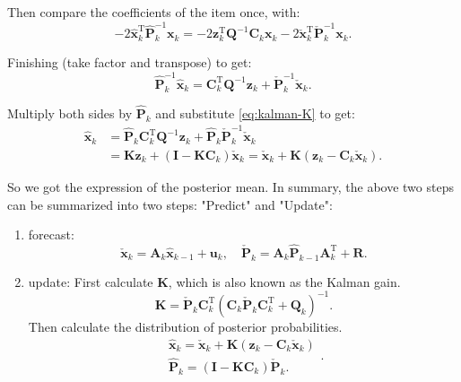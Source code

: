 Then compare the coefficients of the item once, with:
\begin{equation}
- 2\hat {\bm{x}}_k^\mathrm{T} \hat{\bm{P}}_k^{ - 1}{\bm{x}_k} =  - 2\bm{z}_k^\mathrm{T} {\bm{Q}^{ - 1}}{\bm{C}_k}{\bm{x}_k} - 2\bm{\check {x}}_k^\mathrm{T} \bm{\check {P}}_k^{ - 1}{\bm{x}_k}.
\end{equation}

Finishing (take factor and transpose) to get:
\begin{equation}
\hat { \bm{P}}_k^{ - 1}{{\hat{\bm{x}}}_k} = \bm{C}_k^\mathrm{T} {\bm{Q}^{ - 1}}{\bm{z}_k} + \check{\bm{P}}_k^{ - 1}{{\bm{\check{x}}}_k}.
\end{equation}

Multiply both sides by $\bm{\hat{P}}_k$ and substitute \eqref{eq:kalman-K} to get:
\begin{align}
{{\bm{\hat {x}}}_k} &= {{\hat {\bm{P}}}_k} \bm{C}_k^\mathrm{T} { \bm{Q}^{ - 1}}{\bm{z}_k} + {{\bm{\hat{ P}}}_k}\check {\bm{P}}_k^{ - 1}{{\check {\bm{x}}}_k}\\
&= \bm{K} {\bm{z}_k} + \left( {\bm{I} - \bm{K}{\bm{C}_k}} \right){{\bm{\check {x}}}_k} = {{\check {\bm{x}}}_k} + \bm{K} \left( {\bm{z}_k - {\bm{C}_k}{\bm{\check{x}}_k}} \right).
\end{align}

So we got the expression of the posterior mean. In summary, the above two steps can be summarized into two steps: "Predict" and "Update":

\begin{mdframed}
\begin{enumerate}
\item forecast:
\begin{equation}
\check{\bm{x}}_k = {\bm{A}_k {{\hat{\bm{x}}}_{k - 1}} + {\bm{u}_k}}, \quad \check{\bm{P}}_k = {\bm{A}_k \hat{\bm{P}}_{k-1} { \bm{A}^\mathrm{T}_k} + \bm {R}}.
\end{equation}
\item update:
First calculate $\bm{K}$, which is also known as the Kalman gain.
\begin{equation}
\label{eq:kalman-K-another}
\bm{K} = {{\check {\bm{P}}}_k} \bm{C}_k^\mathrm{T} {\left( {{\bm{C}_k}{{\check { \bm{P}}}_k}\bm{C}_k^\mathrm{T} + {\bm{Q}_k}} \right)^{ - 1}}.
\end{equation}
Then calculate the distribution of posterior probabilities.
\begin{equation}
\begin{array}{l}
\hat {\bm{x}}_k = {{\check {\bm{x}}}_k} + \bm{K} \left( {\bm{z}_k - {\bm{C}_k} {\bm{\check{x}}_k}} \right)\\
{{\bm{\hat {P}}}_k} = \left( {\bm{I} - \bm{K}{\bm{C}_k}} \right) \check{\bm{P} }_k.
\end{array}.
\end{equation}
\end{enumerate}
\end{mdframed}

